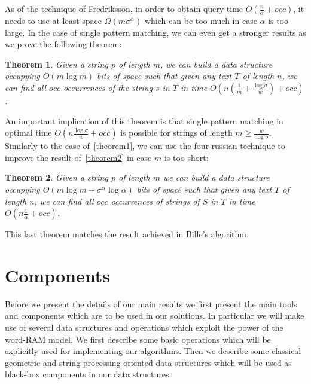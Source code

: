 \documentclass{article}
\newcommand{\?}{\mskip1.5mu}
\newtheorem{theorem}{Theorem}
\begin{document}
As of the technique of Fredriksson, in order to obtain query time $O(\frac{n}{\alpha}+occ)$, it needs to use at least space $\Omega(m\sigma^\alpha)$ which can be too much in case $\alpha$ is too large. 
In the case of single pattern matching, we can even get a stronger results as we prove the following theorem: 
\begin{theorem}
\label{theorem3}
Given a string $p$ of length $m$, we can build a data structure occupying $O(m\log m)$ bits of space such that given any text $T$ of length $n$, we can find all $occ$ occurrences of the string $s$ in $T$ in time $O(n(\frac{1}{m}+\frac{\log\sigma}{w})+occ)$.
\end{theorem}
An important implication of this theorem is that single pattern matching in optimal time $O(n\frac{\log\sigma}{w}+occ)$ is possible for strings of length $m\geq \frac{w}{\log\sigma}$. 
\\ Similarly to the case of~\ref{theorem1}, we can use the four russian technique to improve the result of~\ref{theorem2} in case $m$ is too short: 
\begin{theorem}
\label{theorem4}
Given a string $p$ of length $m$ we can build a data structure occupying $O(m\log m+\sigma^\alpha\log \alpha)$ bits of space such that given any text $T$ of length $n$, we can find all $occ$ occurrences of strings of $S$ in $T$ in time $O(n\frac{1}{\alpha}+occ)$. 
\end{theorem}
This last theorem matches the result achieved in Bille's  algorithm. 
\section{Components}

Before we present the details of our main results we first present the main tools and components which are to be used in our solutions. In particular we will make use of several data structures and operations which exploit the power of the word-RAM model. We first describe some basic operations which will be explicitly used for implementing our algorithms. Then we describe some classical geometric and string processing oriented data structures which will be used as black-box components in our data structures.  
\end{document}
